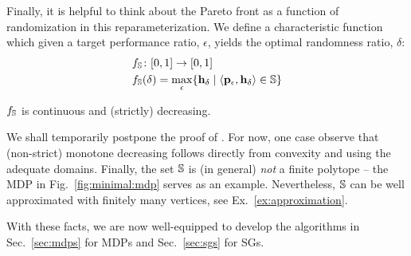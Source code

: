 Finally, it is helpful to think about the Pareto front as a function of randomization in this reparameterization.  We define a characteristic function which given a target
performance ratio, $\epsilon$, yields the optimal randomness ratio,
$\delta$:
\begin{equation}
  \begin{split}
    & f_\mathbb{S}\colon [0,1] \rightarrow [0, 1]    \\
    & f_\mathbb{S}(\delta) = \max_\epsilon \{ \mathbf{h}_\delta \mid \langle
    \mathbf{p}_\epsilon, \mathbf{h}_\delta \rangle \in \mathbb{S} \} 
  \end{split}
\end{equation}
\begin{proposition}\label{prop:monotone}
  $f_\mathbb{S}$ is continuous and (strictly) decreasing.
\end{proposition}
 We shall temporarily postpone the proof of
. For now, one case observe that
(non-strict) monotone decreasing follows directly from convexity and
using the adequate domains.
Finally, the set  $\mathbb{S}$ is (in general) \emph{not} a finite polytope -- the MDP in Fig.~\ref{fig:minimal:mdp} serves as an example. Nevertheless,  $\mathbb{S}$ can be well approximated with finitely many vertices, see Ex.~\ref{ex:approximation}.

With these facts, we are now well-equipped to develop the algorithms in Sec.~\ref{sec:mdps} for MDPs and Sec.~\ref{sec:sgs} for SGs.

